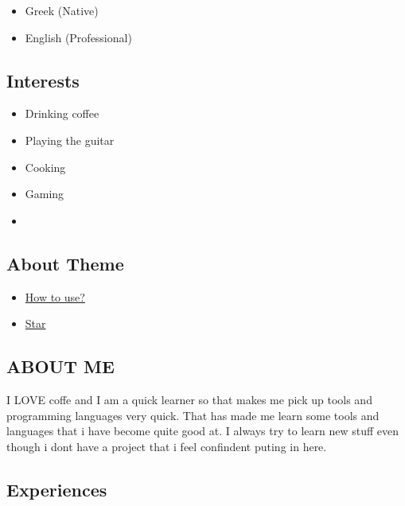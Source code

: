 \documentclass[english,]{article}
\providecommand{\tightlist}{%
  \setlength{\itemsep}{0pt}\setlength{\parskip}{0pt}}
\begin{document}
\begin{itemize}
\tightlist
\item
  Greek {(Native)}
\item
  English {(Professional)}
\end{itemize}

\hypertarget{interests}{%
\subsection{Interests}\label{interests}}

\begin{itemize}
\item
  Drinking coffee
\item
  Playing the guitar
\item
  Cooking
\item
  Gaming
\item
\end{itemize}

\hypertarget{about-theme}{%
\subsection{About Theme}\label{about-theme}}

\begin{itemize}
\tightlist
\item
  \href{https://www.youtube.com/watch?v=Jnmj1dXDbNk}{How to use?}
\item
  \href{https://github.com/sharu725/online-cv}{Star}
\end{itemize}

\hypertarget{about-me}{%
\subsection{\texorpdfstring{{ \emph{} \emph{} } ABOUT
ME}{    ABOUT ME}}\label{about-me}}

I LOVE coffe and I am a quick learner so that makes me pick up tools and
programming languages very quick. That has made me learn some tools and
languages that i have become quite good at. I always try to learn new
stuff even though i dont have a project that i feel confindent puting in
here.

\hypertarget{experiences}{%
\subsection{\texorpdfstring{{ \emph{} \emph{} }
Experiences}{    Experiences}}\label{experiences}}
\end{document}
